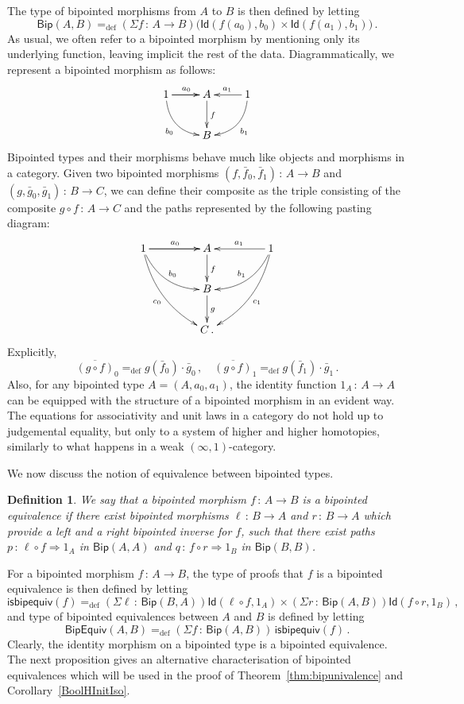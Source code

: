 \documentclass[10pt,a4paper,oneside,reqno]{amsart}
\theoremstyle{mythm}
\theoremstyle{mydef}
\newtheorem{definition}[theorem]{Definition}
\theoremstyle{myrmk}
\newcommand{\ie}{\text{i.e.\ }}
\newcommand{\myemph}[1]{\textit{#1}}
\newcommand{\defeq}{=_{\mathrm{def}}}
\newcommand{\co}{\,{:}\,}
\newcommand{\Id}{\mathsf{Id}}
\newcommand{\Bip}{\mathsf{Bip}}
\newcommand{\BipHom}{\mathsf{Bip}}
\newcommand{\isbipequiv}{\mathsf{isbipequiv}}
\newcommand{\BipEquiv}{\mathsf{BipEquiv}}
\begin{document}
The type of bipointed morphisms from $A$ to $B$ is then defined by letting
\[
\BipHom(A,B) \defeq (\Sigma f \co A \to B) \big( \Id(  f(a_0), b_0 )  \times \Id(  f(a_1), b_1 )  \big) \, .
\]
As usual, we often refer to a bipointed morphism by mentioning only its underlying function, leaving implicit
the rest of the data. Diagrammatically, we represent a bipointed morphism as follows:
\[
\xymatrix{
1 \ar[r]   \ar[r]^{a_0} \ar@/_1pc/[dr]_{b_0}  & A  \ar[d]^{f} & 1  \ar[l]_{a_1} \ar@/^1pc/[dl]^{b_1} \\
  & B  &  }
 \]
Bipointed types and their morphisms behave much like objects and morphisms in a category.
Given two bipointed morphisms  $(f, \bar{f}_0, \bar{f}_1) \co A \to B$ and $(g, \bar{g}_0, \bar{g}_1) \co B \to C$, we can define their composite 
 as the triple consisting of the composite $g \circ f \co A \to C$ and the paths represented
by the following pasting diagram:
\[
\xymatrix@C=1.5cm{
1 \ar[r]   \ar[r]^{a_0}   \ar@/_1pc/[dr]^{b_0} \ar@/_1pc/[ddr]_{c_0}  & A  \ar[d]^{f} & 1 \ar[l]_{a_1}  \ar@/^1pc/[dl]_{b_1}  \ar@/^1pc/[ddl]^{c_1} \\
  & B \ar[d]^g &   \\
  & C \, . &   }
  \]
Explicitly,
\[
\overline{(g \circ f)}_0 \defeq g(\bar{f}_0) \cdot  \bar{g}_0 \, ,   \quad 
\overline{(g \circ f) }_1 \defeq  g(\bar{f}_1) \cdot   \bar{g}_1 \, .
\]
Also, for any bipointed type $A = (A, a_0, a_1)$, the identity function $1_A \co A \to A$ can be equipped with the structure of a bipointed morphism in an evident way. 
The equations for associativity and unit laws in a category do not hold up to judgemental equality, but only 
to a system of higher and higher homotopies, similarly to what happens in a weak $(\infty,1)$-category.  

\medskip

We now discuss the notion of equivalence between bipointed types.



\begin{definition} We say that a bipointed morphism $f \co A \to B$ is a \myemph{bipointed equivalence}
if there exist bipointed morphisms $\ell \co B \to A$ and $r \co B \to A$ which provide a left and a right bipointed inverse for $f$, \ie such that there exist paths $p \co \ell \circ f \Rightarrow 1_A$ in $\Bip(A,A)$ and $q \co f \circ r \Rightarrow 1_B$
in $\Bip(B,B)$.
\end{definition}

For a bipointed morphism $f \co A \to B$, the type of proofs that $f$ is a bipointed equivalence is
then defined by letting
\[
\isbipequiv(f) \defeq   (\Sigma \ell \co \BipHom(B,A)) \Id( \ell \circ f, 1_A ) \times 
    (\Sigma r \co \BipHom(A, B)) \Id (f \circ r , 1_B ) \, ,
\]
and type of bipointed equivalences between $A$ and $B$ is defined by letting
\[
\BipEquiv(A, B)
\defeq    
(\Sigma f \co \BipHom(A,B)) \, \isbipequiv(f)  \, . 
\] 
Clearly, the identity morphism on a bipointed type is a bipointed equivalence. The next proposition
gives an alternative characterisation of bipointed equivalences which will be used
 in the proof of Theorem~\ref{thm:bipunivalence} and Corollary~\ref{BoolHInitIso}.
\end{document}
